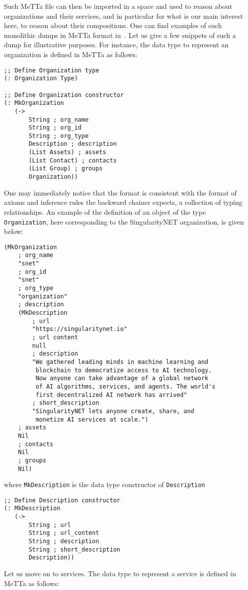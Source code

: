 \documentclass[]{report}
\begin{document}
Such MeTTa file can then be imported in a space and used to reason
about organizations and their services, and in particular for what is
our main interest here, to reason about their compositions.  One can
find examples of such monolithic dumps in MeTTa format in~\cite{TODO}.
Let us give a few snippets of such a dump for illustrative purposes.
For instance, the data type to represent an organization is defined in
MeTTa as follows:
\begin{verbatim}
;; Define Organization type
(: Organization Type)

;; Define Organization constructor
(: MkOrganization
   (->
       String ; org_name
       String ; org_id
       String ; org_type
       Description ; description
       (List Assets) ; assets
       (List Contact) ; contacts
       (List Group) ; groups
       Organization))
\end{verbatim}
One may immediately notice that the format is consistent with the
format of axioms and inference rules the backward chainer expects, a
collection of typing relationships.  An example of the definition of
an object of the type \texttt{Organization}, here
corresponding to the SingularityNET organization, is given below:
\begin{verbatim}
(MkOrganization
    ; org_name
    "snet"
    ; org_id
    "snet"
    ; org_type
    "organization"
    ; description
    (MkDescription
        ; url
        "https://singularitynet.io"
        ; url content
        null
        ; description
        "We gathered leading minds in machine learning and
         blockchain to democratize access to AI technology.
         Now anyone can take advantage of a global network
         of AI algorithms, services, and agents. The world's
         first decentralized AI network has arrived"
        ; short_description
        "SingularityNET lets anyone create, share, and
         monetize AI services at scale.")
    ; assets
    Nil
    ; contacts
    Nil
    ; groups
    Nil)
\end{verbatim}
where \texttt{MkDescription} is the data type constructor
of \texttt{Description}
\begin{verbatim}
;; Define Description constructor
(: MkDescription
   (->
       String ; url
       String ; url_content
       String ; description
       String ; short_description
       Description))
\end{verbatim}
Let us move on to services.  The data type to represent a service is
defined in MeTTa as follows:
\end{document}
